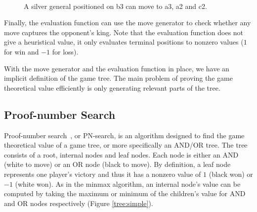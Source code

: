 \documentclass{article}
\begin{document}
\begin{figure}[h]
\center
    \mbox{
       \quad
      }
\caption{A silver general positioned on b3 can move to a3, a2 and c2.}
\label{moveboard}
\end{figure}

Finally, the evaluation function can use the move generator to check whether any move captures the opponent's king. Note that the evaluation function
does not give a heuristical value, it only evaluates terminal positions to nonzero values ($1$ for win and $-1$ for loss).

With the move generator and the evaluation function in place, we have an implicit definition of the game tree. The main problem of proving the game
theoretical value efficiently is only generating relevant parts of the tree.

\subsection{Proof-number Search}
\label{pnsearch}
Proof-number search~\cite{allis1994proof}, or PN-search, is an algorithm designed to find the game theoretical value of a game tree, or more specifically an AND/OR tree.
The tree consists of a root, internal nodes and leaf nodes. Each node is either an AND (white to move) or an OR node (black to move). By definition, a leaf
node represents one player's victory and thus it has a nonzero value of $1$ (black won) or $-1$ (white won). As in the minmax algorithm, an internal
node's value can be computed by taking the maximum or minimum of the children's value for AND and OR nodes respectively (Figure \ref{tree:simple}).
\end{document}
